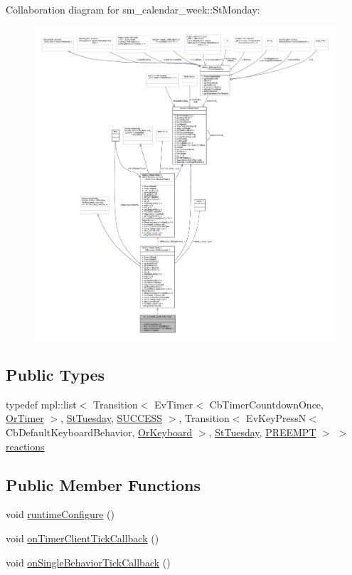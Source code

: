 Collaboration diagram for sm\+\_\+calendar\+\_\+week\+:\+:St\+Monday\+:
\nopagebreak
\begin{figure}[H]
\begin{center}
\leavevmode
\includegraphics[width=350pt]{structsm__calendar__week_1_1StMonday__coll__graph}
\end{center}
\end{figure}
\subsection*{Public Types}
\begin{DoxyCompactItemize}
\item 
typedef mpl\+::list$<$ Transition$<$ Ev\+Timer$<$ Cb\+Timer\+Countdown\+Once, \hyperlink{classsm__calendar__week_1_1OrTimer}{Or\+Timer} $>$, \hyperlink{structsm__calendar__week_1_1StTuesday}{St\+Tuesday}, \hyperlink{classSUCCESS}{S\+U\+C\+C\+E\+SS} $>$, Transition$<$ Ev\+Key\+PressN$<$ Cb\+Default\+Keyboard\+Behavior, \hyperlink{classsm__calendar__week_1_1OrKeyboard}{Or\+Keyboard} $>$, \hyperlink{structsm__calendar__week_1_1StTuesday}{St\+Tuesday}, \hyperlink{classPREEMPT}{P\+R\+E\+E\+M\+PT} $>$ $>$ \hyperlink{structsm__calendar__week_1_1StMonday_a6fee9231d13553ae7370225d9b1f28f9}{reactions}
\end{DoxyCompactItemize}
\subsection*{Public Member Functions}
\begin{DoxyCompactItemize}
\item 
void \hyperlink{structsm__calendar__week_1_1StMonday_aed3cf2a8d76902e9f35d66e99de0a1f9}{runtime\+Configure} ()
\item 
void \hyperlink{structsm__calendar__week_1_1StMonday_a7d1e6fe61b8618791254704a41cc1833}{on\+Timer\+Client\+Tick\+Callback} ()
\item 
void \hyperlink{structsm__calendar__week_1_1StMonday_aa87c025ae961c07bbcfc7af25b721f1e}{on\+Single\+Behavior\+Tick\+Callback} ()
\end{DoxyCompactItemize}
